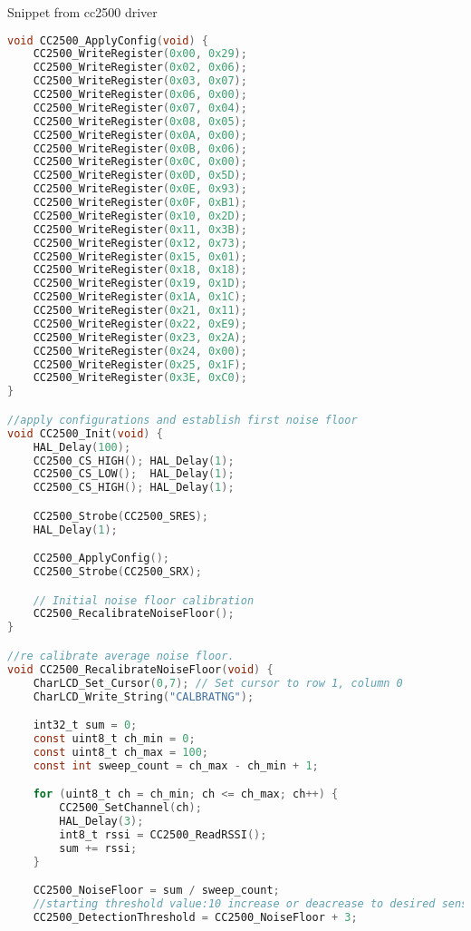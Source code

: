 \documentclass[12pt]{article}
\begin{document}
\vspace{1em}
\text Snippet from cc2500 driver
\begin{lstlisting}[language=C]
void CC2500_ApplyConfig(void) {
    CC2500_WriteRegister(0x00, 0x29);
    CC2500_WriteRegister(0x02, 0x06);
    CC2500_WriteRegister(0x03, 0x07);
    CC2500_WriteRegister(0x06, 0x00);
    CC2500_WriteRegister(0x07, 0x04);
    CC2500_WriteRegister(0x08, 0x05);
    CC2500_WriteRegister(0x0A, 0x00);
    CC2500_WriteRegister(0x0B, 0x06);
    CC2500_WriteRegister(0x0C, 0x00);
    CC2500_WriteRegister(0x0D, 0x5D);
    CC2500_WriteRegister(0x0E, 0x93);
    CC2500_WriteRegister(0x0F, 0xB1);
    CC2500_WriteRegister(0x10, 0x2D);
    CC2500_WriteRegister(0x11, 0x3B);
    CC2500_WriteRegister(0x12, 0x73);
    CC2500_WriteRegister(0x15, 0x01);
    CC2500_WriteRegister(0x18, 0x18);
    CC2500_WriteRegister(0x19, 0x1D);
    CC2500_WriteRegister(0x1A, 0x1C);
    CC2500_WriteRegister(0x21, 0x11);
    CC2500_WriteRegister(0x22, 0xE9);
    CC2500_WriteRegister(0x23, 0x2A);
    CC2500_WriteRegister(0x24, 0x00);
    CC2500_WriteRegister(0x25, 0x1F);
    CC2500_WriteRegister(0x3E, 0xC0);
}

//apply configurations and establish first noise floor
void CC2500_Init(void) {
    HAL_Delay(100);
    CC2500_CS_HIGH(); HAL_Delay(1);
    CC2500_CS_LOW();  HAL_Delay(1);
    CC2500_CS_HIGH(); HAL_Delay(1);

    CC2500_Strobe(CC2500_SRES);
    HAL_Delay(1);

    CC2500_ApplyConfig();
    CC2500_Strobe(CC2500_SRX);

    // Initial noise floor calibration
    CC2500_RecalibrateNoiseFloor();
}

//re calibrate average noise floor.
void CC2500_RecalibrateNoiseFloor(void) {
	CharLCD_Set_Cursor(0,7); // Set cursor to row 1, column 0
	CharLCD_Write_String("CALBRATNG");

	int32_t sum = 0;
    const uint8_t ch_min = 0;
    const uint8_t ch_max = 100;
    const int sweep_count = ch_max - ch_min + 1;

    for (uint8_t ch = ch_min; ch <= ch_max; ch++) {
        CC2500_SetChannel(ch);
        HAL_Delay(3);
        int8_t rssi = CC2500_ReadRSSI();
        sum += rssi;
    }

    CC2500_NoiseFloor = sum / sweep_count;
    //starting threshold value:10 increase or deacrease to desired sensitivity. TODO Possibly integrate button to change this value.
    CC2500_DetectionThreshold = CC2500_NoiseFloor + 3;


\end{lstlisting}
\end{document}
